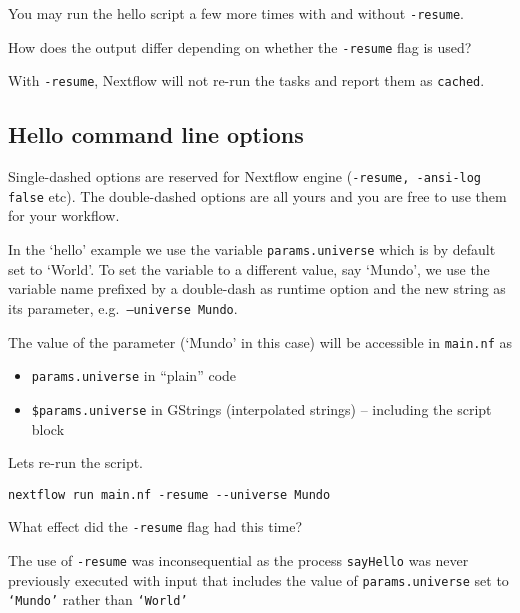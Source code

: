 You may run the hello script a few more times with and without \texttt{-resume}.

\begin{questions}
How does the output differ depending on whether the \texttt{-resume} flag is used?
\begin{answer}
With \texttt{-resume}, Nextflow will not re-run the tasks and report them as \texttt{cached}. 
\end{answer}
\end{questions}

\newpage

\subsection{Hello command line options}

Single-dashed options are reserved for Nextflow engine (\texttt{-resume, -ansi-log false} etc). 
The double-dashed options are all yours and you are free to use them for your workflow. 

In the `hello' example we use the variable \texttt{params.universe} which is by default set to `World'.
To set the variable to a different value, say `Mundo', we use the variable name prefixed by a double-dash 
as runtime option and the new string as its parameter, e.g.\ \texttt{--universe Mundo}.

The value of the parameter (`Mundo' in this case) will be accessible in \texttt{main.nf} as 

\begin{itemize}
\item \texttt{params.universe} in ``plain'' code 
\item \texttt{\$params.universe} in GStrings (interpolated strings) -- including the script block
\end{itemize}


\begin{steps}

Lets re-run the script.

\begin{lstlisting}
nextflow run main.nf -resume --universe Mundo 
\end{lstlisting}
\end{steps}

\begin{questions}
What effect did the \texttt{-resume} flag had this time?
\begin{answer}
The use of \texttt{-resume} was inconsequential as the process \texttt{sayHello}
was never previously executed with input that includes the value of \texttt{params.universe} 
set to \texttt{`Mundo'} rather than \texttt{`World'}
\end{answer}
\end{questions}

